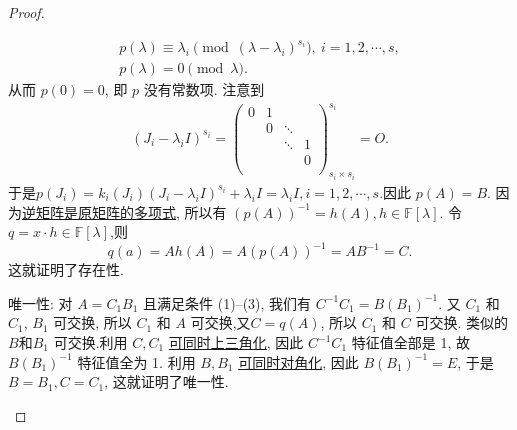 \documentclass[../../main.tex]{subfiles}%
\begin{document}
\begin{proof}
\begin{enumerate}
\begin{gather*}
p(\lambda) \equiv \lambda_i \pmod{(\lambda - \lambda_i)^{s_i}},\ i = 1, 2, \cdots, s,
\\
p(\lambda) = 0 \pmod{\lambda}.
\end{gather*}
从而  \( p(0) = 0 \), 即 \( p \) 没有常数项.
注意到
\begin{align*}
\left( J_i-\lambda _iI \right) ^{s_i}=\left( \begin{matrix}
0&		1&		&		\\
&		0&		\ddots&		\\
&		&		\ddots&		1\\
&		&		&		0\\
\end{matrix} \right) _{s_i\times s_i}^{s_i}=O.
\end{align*}
于是$p(J_i)=k_i\left( J_i \right) \left( J_i-\lambda _iI \right) ^{s_i}+\lambda _iI=\lambda _iI,i=1,2,\cdots ,s.$因此 \( p(A) = B.\)
因为\hyperref[proposition:矩阵的逆可以用其多项式表示]{逆矩阵是原矩阵的多项式}, 所以有 \( (p(A))^{-1} = h(A), h \in \mathbb{F}[\lambda] \). 令 \( q = x \cdot h \in \mathbb{F}[\lambda] \),则
$$
q(a)=Ah(A)=A(p(A))^{-1}=AB^{-1}=C.
$$
这就证明了存在性.

{\heiti 唯一性:} 对 \( A = C_1B_1 \) 且满足条件 (1)--(3), 我们有 \( C^{-1}C_1 = B(B_1)^{-1} \). 又 \( C_1 \) 和 \( C_1 \), \( B_1 \) 可交换, 所以 \( C_1 \) 和 \( A \) 可交换,又$C=q(A)$, 所以 \( C_1 \) 和 \( C \) 可交换. 类似的 \( B\)和\( B_1 \) 可交换.利用 \( C, C_1 \) \hyperref[proposition:一族两两可交换的一般域上的矩阵可同时上三角化]{可同时上三角化}, 因此 \( C^{-1}C_1 \) 特征值全部是 1, 故 \( B(B_1)^{-1} \) 特征值全为 1. 利用 \( B, B_1 \) \hyperref[proposition:一族两两可交换的可对角化矩阵可同时相似对角化]{可同时对角化}, 因此 \( B(B_1)^{-1} = E \), 于是 \( B = B_1, C = C_1 \), 这就证明了唯一性.
\end{enumerate}
\end{proof}
\end{document}
